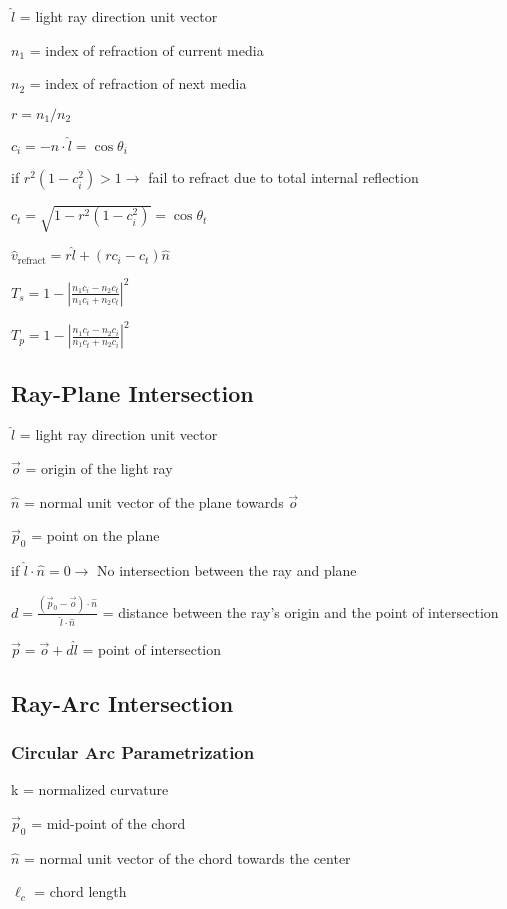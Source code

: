 \documentclass{article}
\begin{document}
$\hat{l}$ = light ray direction unit vector

$n_1$ = index of refraction of current media

$n_2$ = index of refraction of next media

$r = n_1 / n_2$

$c_i = -\hat{n} \cdot{} \hat{l} = \cos{\theta_i}$

if $r^2 (1 - c_i^2) > 1 \to$ fail to refract due to total internal reflection

$c_t = \sqrt{1 - r^2 (1 - c_i^2)} = \cos{\theta_t}$

$\hat{v}_{\text{refract}} = r \hat{l} + (r c_i - c_t) \hat{n}$

$T_{s} = 1 - | \frac{n_1 c_i - n_2 c_t}{n_1 c_i + n_2 c_t} |^2$

$T_{p} = 1 - | \frac{n_1 c_t - n_2 c_i}{n_1 c_t + n_2 c_i} |^2$


\subsection{Ray-Plane Intersection}\label{subsec:ray-plane-intersection}
$\hat{l}$ = light ray direction unit vector

$\vec{o}$ = origin of the light ray

$\hat{n}$ = normal unit vector of the plane towards $\vec{o}$

$\vec{p}_0$ = point on the plane

if $\hat{l} \cdot \hat{n} = 0 \to $ No intersection between the ray and plane

$d = \frac{(\vec{p}_0 - \vec{o}) \cdot \hat{n}}{\hat{l} \cdot \hat{n}}$ = distance between the ray's origin and the point of intersection

$\vec{p} = \vec{o} + d\hat{l}$ = point of intersection


\subsection{Ray-Arc Intersection}\label{subsec:ray-arc-intersection}
\subsubsection{Circular Arc Parametrization}
k = normalized curvature

$\vec{p}_0$ = mid-point of the chord

$\hat{n}$ = normal unit vector of the chord towards the center

$\ell_c$ = chord length
\end{document}
